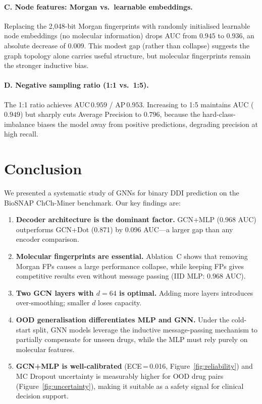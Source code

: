 \documentclass[10pt,twocolumn]{article}
\begin{document}
\paragraph{C. Node features: Morgan vs.\ learnable embeddings.}
Replacing the 2{,}048-bit Morgan fingerprints with randomly initialised
learnable node embeddings (no molecular information) drops AUC from
$0.945$ to $0.936$, an absolute decrease of 0.009.
This modest gap (rather than collapse) suggests the graph topology alone
carries useful structure, but molecular fingerprints remain the stronger
inductive bias.

\paragraph{D. Negative sampling ratio (1:1 vs.\ 1:5).}
The 1:1 ratio achieves AUC\,$0.959$ / AP\,$0.953$.
Increasing to 1:5 maintains AUC ($0.949$) but sharply cuts Average
Precision to $0.796$, because the hard-class-imbalance biases the model
away from positive predictions, degrading precision at high recall.

\section{Conclusion}

We presented a systematic study of GNNs for binary DDI prediction on the
BioSNAP ChCh-Miner benchmark.
Our key findings are:

\begin{enumerate}[leftmargin=*,noitemsep,topsep=1pt]
  \item \textbf{Decoder architecture is the dominant factor.}
        GCN+MLP (0.968 AUC) outperforms GCN+Dot (0.871) by 0.096 AUC—a
        larger gap than any encoder comparison.
  \item \textbf{Molecular fingerprints are essential.}
        Ablation~C shows that removing Morgan FPs causes a large performance
        collapse, while keeping FPs gives competitive results even without
        message passing (IID MLP: 0.968 AUC).
  \item \textbf{Two GCN layers with $d{=}64$ is optimal.}
        Adding more layers introduces over-smoothing; smaller $d$ loses
        capacity.
  \item \textbf{OOD generalisation differentiates MLP and GNN.}
        Under the cold-start split, GNN models leverage the inductive
        message-passing mechanism to partially compensate for unseen drugs,
        while the MLP must rely purely on molecular features.
  \item \textbf{GCN+MLP is well-calibrated} (ECE\,=\,0.016, Figure~\ref{fig:reliability})
        and MC Dropout uncertainty is measurably higher for OOD drug pairs
        (Figure~\ref{fig:uncertainty}), making it suitable as a safety signal
        for clinical decision support.
\end{enumerate}
\end{document}
